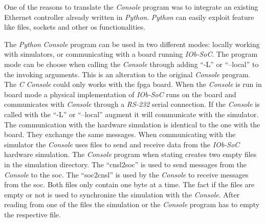 One of the reasons to translate the \textit{Console} program was to integrate an existing Ethernet controller already written in \textit{Python}. \textit{Python} can easily exploit feature like files, sockets and other \acrfull{os} functionalities.

The \textit{Python} \textit{Console} program can be used in two different modes: locally working with simulators, or communicating with a board running \textit{IOb-SoC}. The program mode can be choose when calling the \textit{Console} through adding \enquote{-L} or \enquote{--local} to the invoking arguments. This is an alteration to the original \textit{Console} program. The \textit{C} \textit{Console} could only works with the \acrshort{fpga} board. When the \textit{Console} is run in board mode a physical implementation of \textit{IOb-SoC} runs on the board and communicates with \textit{Console} through a \textit{RS-232} serial connection. If the \textit{Console} is called with the \enquote{-L} or \enquote{--local} augment it will communicate with the simulator. The communication with the hardware simulation is identical to the one with the board. They exchange the same messages. When communicating with the simulator the \textit{Console} uses files to send and receive data from the \textit{IOb-SoC} hardware simulation. The \textit{Console} program when stating creates two empty files in the simulation directory. The \enquote{cnsl2soc} is used to send messages from the \textit{Console} to the \acrshort{soc}. The \enquote{soc2cnsl} is used by the \textit{Console} to receive messages from the \acrshort{soc}. Both files only contain one byte at a time. The fact if the files are empty or not is used to synchronize the simulation with the \textit{Console}. After reading from one of the files the simulation or the \textit{Console} program has to empty the respective file.

